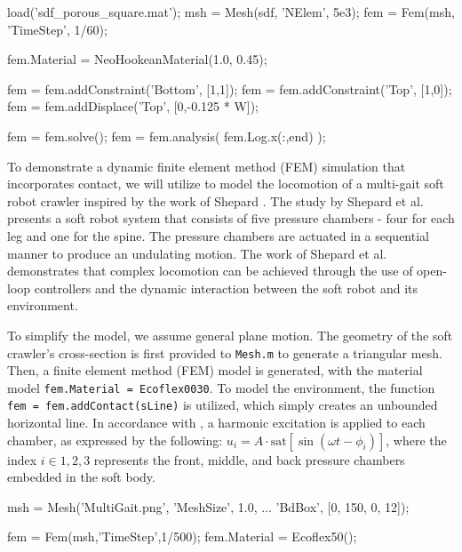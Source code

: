\begin{matlabcode}
load('sdf_porous_square.mat');
msh = Mesh(sdf, 'NElem', 5e3);
fem = Fem(msh, 'TimeStep', 1/60);

fem.Material = NeoHookeanMaterial(1.0, 0.45);

fem = fem.addConstraint('Bottom', [1,1]);
fem = fem.addConstraint('Top', [1,0]);
fem = fem.addDisplace('Top', [0,-0.125 * W]);

fem = fem.solve();
fem = fem.analysis( fem.Log.x(:,end) );
\end{matlabcode}
    

\begin{example}
To demonstrate a dynamic finite element method (FEM) simulation that incorporates contact, we will utilize \sorotoki to model the locomotion of a multi-gait soft robot crawler inspired by the work of Shepard \cite{Shepherd2011Dec}. The study by Shepard  et al. \cite{Shepherd2011Dec} presents a soft robot system that consists of five pressure chambers - four for each leg and one for the spine. The pressure chambers are actuated in a sequential manner to produce an undulating motion. The work of Shepard  et al. \cite{Shepherd2011Dec} demonstrates that complex locomotion can be achieved through the use of open-loop controllers and the dynamic interaction between the soft robot and its environment.

To simplify the model, we assume general plane motion. The geometry of the soft crawler's cross-section is first provided to \texttt{Mesh.m} to generate a triangular mesh. Then, a finite element method (FEM) model is generated, with the material model \texttt{fem.Material = Ecoflex0030}. To model the environment, the function \texttt{fem = fem.addContact(sLine)} is utilized, which simply creates an unbounded horizontal line. In accordance with \cite{Shepherd2011Dec}, a harmonic excitation is applied to each chamber, as expressed by the following: $u_i = A\cdot\textrm{sat}\left[\sin(\omega t - \phi_i) \right]$, where the index $i \in {1,2,3}$ represents the front, middle, and back pressure chambers embedded in the soft body. 

\begin{matlabcode} 
msh = Mesh('MultiGait.png', 'MeshSize', 1.0, ...
            'BdBox', [0, 150, 0, 12]);

fem = Fem(msh,'TimeStep',1/500);
fem.Material = Ecoflex50();


\end{matlabcode}
\end{example}
